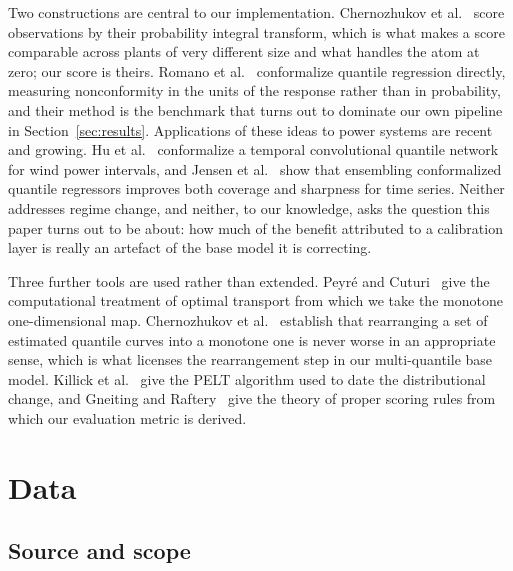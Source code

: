 \documentclass[preprint,3p,times]{elsarticle}
\begin{document}
Two constructions are central to our implementation. Chernozhukov et al.~\cite{chernozhukov2021} score observations by their probability integral transform, which is what makes a score comparable across plants of very different size and what handles the atom at zero; our score is theirs. Romano et al.~\cite{romano2019} conformalize quantile regression directly, measuring nonconformity in the units of the response rather than in probability, and their method is the benchmark that turns out to dominate our own pipeline in Section~\ref{sec:results}. Applications of these ideas to power systems are recent and growing. Hu et al.~\cite{hu2022} conformalize a temporal convolutional quantile network for wind power intervals, and Jensen et al.~\cite{jensen2024} show that ensembling conformalized quantile regressors improves both coverage and sharpness for time series. Neither addresses regime change, and neither, to our knowledge, asks the question this paper turns out to be about: how much of the benefit attributed to a calibration layer is really an artefact of the base model it is correcting.

Three further tools are used rather than extended. Peyr\'e and Cuturi~\cite{peyre2019} give the computational treatment of optimal transport from which we take the monotone one-dimensional map. Chernozhukov et al.~\cite{chernozhukov2010} establish that rearranging a set of estimated quantile curves into a monotone one is never worse in an appropriate sense, which is what licenses the rearrangement step in our multi-quantile base model. Killick et al.~\cite{killick2012} give the PELT algorithm used to date the distributional change, and Gneiting and Raftery~\cite{gneiting2007} give the theory of proper scoring rules from which our evaluation metric is derived.

\section{Data}
\label{sec:data}

\subsection{Source and scope}
\end{document}
